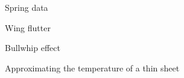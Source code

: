



%
%



\begin{project}{Spring data}
	\label{proj:spring}

	
\end{project}











%
%



\begin{project}{Wing flutter}
	\label{proj:wing}

	
\end{project}










%
%



\begin{project}{Bullwhip effect}
	\label{proj:bullwhip}

	
\end{project}









%
%



\begin{project}{Approximating the temperature of a thin sheet}
	\label{proj:numericalPDE}

	
\end{project}









